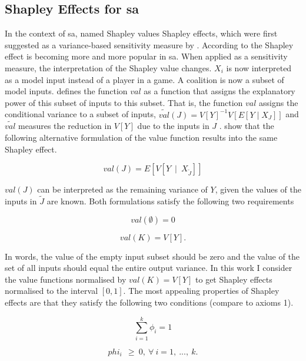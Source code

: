 \subsection{Shapley Effects for sa}

In the context of sa, \cite{SNS16} named Shapley values Shapley effects, which were first suggested as a variance-based sensitivity measure by \cite{O14}. According to \cite{PRB20} the Shapley effect is becoming more and more popular in sa.
When applied as a sensitivity measure, the interpretation of the Shapley value changes. $X_i$ is now interpreted as a model input instead of a player in a game. A coalition is now a subset of model inputs. \cite{O14} defines the function $val$ as a function that assigns the explanatory power of this subset of inputs to this subset. That is, the function $val$ assigns the conditional variance to a subset of inputs, $\tilde{val}(J)=V[Y]^{-1}V[E[Y \mid X_J]]$ and $\tilde{val}$ measures the reduction in $V[Y]$ due to the inputs in $J$ \cite{SNS16}. \cite{SNS16} show that the following alternative formulation of the value function results into the same Shapley effect.

\begin{equation}
val(J)=E[V[Y\ \mid\ X_{\tilde J}]]
\end{equation}

$val(J)$ can be interpreted as the remaining variance of $Y$, given the values of the inputs in $\tilde J$ are known. Both formulations satisfy the following two requirements

\begin{equation}
val(\emptyset) = 0
\end{equation}

\begin{equation}
val(K)=V[Y].
\end{equation}

In words, the value of the empty input subset should be zero and the value of the set of all inputs should equal the entire output variance. In this work I consider the value functions normalised by $val(K)=V[Y] $ to get Shapley effects normalised to the interval $ [0, 1] $. The most appealing properties of Shapley effects are that they satisfy the following two conditions (compare to axioms 1).

\begin{equation}
\sum_{i=1}^{k}\phi_i=1
\end{equation}

\begin{equation}
phi_i\ \ \geq\ 0,\ \forall\ i=1,\ ...,\ k.
\end{equation}

